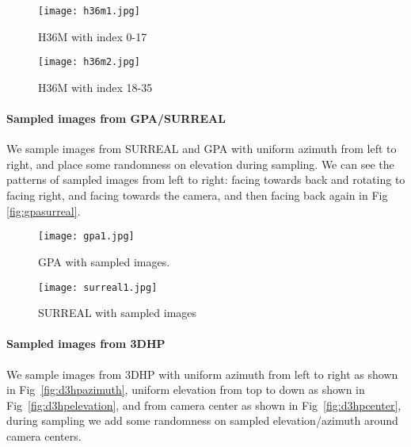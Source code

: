 \documentclass[runningheads]{llncs}
\begin{document}
\begin{figure*}[t]
\centering
\begin{subfigure}{0.48\textwidth}
\texttt{[image: h36m1.jpg]}
\caption{H36M with index 0-17} \label{fig:h36m1}
\end{subfigure}
\hspace*{\fill}
\begin{subfigure}{0.48\textwidth}
\texttt{[image: h36m2.jpg]}
\caption{H36M with index 18-35} \label{fig:h36m2}
\end{subfigure}
\caption{H36M and sampled images.} 
\label{fig:h36m}
\end{figure*}


\paragraph{Sampled images from GPA/SURREAL} We sample images from SURREAL and GPA with uniform azimuth from left to right, and place some randomness on elevation during sampling. We can see the patterns of sampled images from left to right: facing towards back and rotating to facing right, and facing towards the camera, and then facing back again in Fig \ref{fig:gpasurreal}.

\begin{figure*}[t]
\centering
\begin{subfigure}{0.48\textwidth}
\texttt{[image: gpa1.jpg]}
\caption{GPA with sampled images.} \label{fig:gpa}
\end{subfigure}
\hspace*{\fill}
\begin{subfigure}{0.48\textwidth}
\texttt{[image: surreal1.jpg]}
\caption{SURREAL with sampled images} \label{fig:surreal}
\end{subfigure}
\caption{GPA and SURREAL sampled images.} 
\label{fig:gpasurreal}
\end{figure*}

\paragraph{Sampled images from 3DHP} We sample images from 3DHP with uniform azimuth from left to right as shown in Fig~\ref{fig:d3hpazimuth}, uniform elevation from top to down as shown in Fig~\ref{fig:d3hpelevation}, and from camera center as shown in Fig~\ref{fig:d3hpcenter}, during sampling we add some randomness on sampled elevation/azimuth around camera centers.
\end{document}
